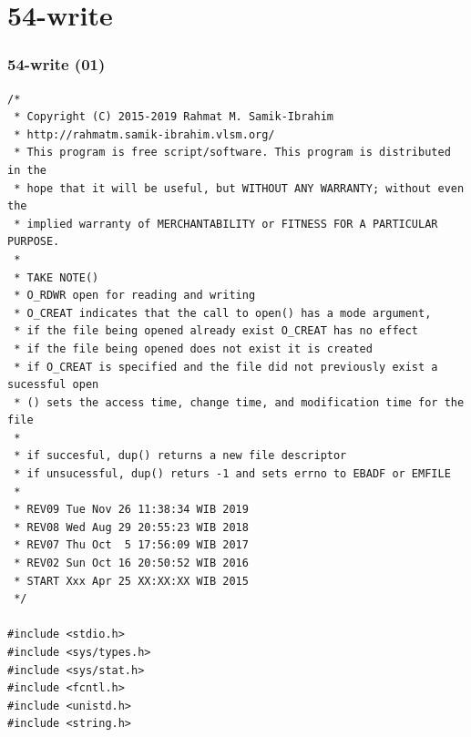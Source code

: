 \documentclass[xcolor=table, notheorems, hyperref={pdfpagelabels=false}]{beamer}
\begin{document}
\section{54-write}
\begin{frame}[fragile]
\frametitle{54-write (01)}
\begin{lstlisting}[basicstyle=\ttfamily\tiny]
/*
 * Copyright (C) 2015-2019 Rahmat M. Samik-Ibrahim
 * http://rahmatm.samik-ibrahim.vlsm.org/
 * This program is free script/software. This program is distributed in the 
 * hope that it will be useful, but WITHOUT ANY WARRANTY; without even the 
 * implied warranty of MERCHANTABILITY or FITNESS FOR A PARTICULAR PURPOSE.
 *
 * TAKE NOTE()
 * O_RDWR open for reading and writing
 * O_CREAT indicates that the call to open() has a mode argument,
 * if the file being opened already exist O_CREAT has no effect
 * if the file being opened does not exist it is created
 * if O_CREAT is specified and the file did not previously exist a sucessful open
 * () sets the access time, change time, and modification time for the file
 *
 * if succesful, dup() returns a new file descriptor
 * if unsucessful, dup() returs -1 and sets errno to EBADF or EMFILE
 *
 * REV09 Tue Nov 26 11:38:34 WIB 2019
 * REV08 Wed Aug 29 20:55:23 WIB 2018
 * REV07 Thu Oct  5 17:56:09 WIB 2017
 * REV02 Sun Oct 16 20:50:52 WIB 2016
 * START Xxx Apr 25 XX:XX:XX WIB 2015
 */

#include <stdio.h>
#include <sys/types.h>
#include <sys/stat.h>
#include <fcntl.h>
#include <unistd.h>
#include <string.h>

\end{lstlisting}
\end{frame}
\end{document}
